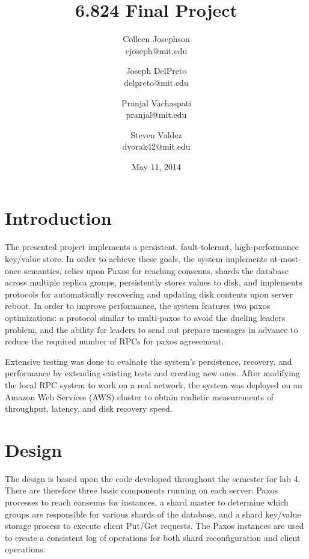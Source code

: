 \documentclass[letterpaper,10pt]{article}
\begin{document}
\title{\Large \bf 6.824 Final Project}
\author{
{\rm Colleen Josephson}\\
cjoseph@mit.edu
\and
{\rm Joseph DelPreto}\\
delpreto@mit.edu
\and
{\rm Pranjal Vachaspati}\\
pranjal@mit.edu
\and
{\rm Steven Valdez}\\
dvorak42@mit.edu
} %

\date{May 11, 2014}

\maketitle


\section{Introduction}
The presented project implements a persistent, fault-tolerant, high-performance key/value store. In order to achieve these goals, the system implements at-most-once semantics, relies upon Paxos for reaching consenus, shards the database across multiple replica groups, persistently stores values to disk, and implements protocols for automatically recovering and updating disk contents upon server reboot.  In order to improve performance, the system features two paxos optimizations: a protocol similar to multi-paxos to avoid the dueling leaders problem, and the ability for leaders to send out prepare messages in advance to reduce the required number of RPCs for paxos agreeement.  

Extensive testing was done to evaluate the system's persistence, recovery, and performance by extending existing tests and creating new ones.  After modifying the local RPC system to work on a real network, the system was deployed on an Amazon Web Services (AWS) cluster to obtain realistic measurements of throughput, latency, and disk recovery speed.

\section{Design} \label{sec:design}
The design is based upon the code developed throughout the semester for lab 4.  There are therefore three basic components running on each server: Paxos processes to reach consenus for instances, a shard master to determine which groups are responsible for various shards of the database, and a shard key/value storage process to execute client Put/Get requests.  The Paxos instances are used to create a consistent log of operations for both shard reconfiguration and client operations.  
\end{document}
